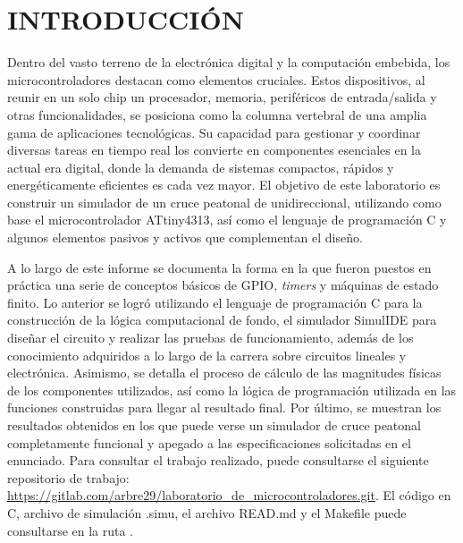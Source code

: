 \newpage
\section{INTRODUCCIÓN}
Dentro del vasto terreno de la electrónica digital y la computación embebida, los microcontroladores destacan como elementos cruciales. Estos dispositivos, al reunir en un solo chip un procesador, memoria, periféricos de entrada/salida y otras funcionalidades, se posiciona como la columna vertebral de una amplia gama de aplicaciones tecnológicas. Su capacidad para gestionar y coordinar diversas tareas en tiempo real los convierte en componentes esenciales en la actual era digital, donde la demanda de sistemas compactos, rápidos y energéticamente eficientes es cada vez mayor. El objetivo de este laboratorio es construir un simulador de un cruce peatonal de unidireccional, utilizando como base el microcontrolador ATtiny4313, así como el lenguaje de programación C y algunos elementos pasivos y activos que complementan el diseño.  

A lo largo de este informe se documenta la forma en la que fueron puestos en práctica una serie de conceptos básicos de GPIO, \textit{timers} y máquinas de estado finito. Lo anterior se logró utilizando el lenguaje de programación C para la construcción de la lógica computacional de fondo, el simulador SimulIDE para diseñar el circuito y realizar las pruebas de funcionamiento, además de los conocimiento adquiridos a lo largo de la carrera sobre circuitos lineales y electrónica. Asimismo, se detalla el proceso de cálculo de las magnitudes físicas de los componentes utilizados, así como la lógica de programación utilizada en las funciones construidas para llegar al resultado final. Por último, se muestran los resultados obtenidos en los que puede verse un simulador de cruce peatonal completamente funcional y apegado a las especificaciones solicitadas en el enunciado. Para consultar el trabajo realizado, puede consultarse el siguiente repositorio de trabajo: \url{https://gitlab.com/arbre29/laboratorio_de_microcontroladores.git}. El código en C, archivo de simulación .simu, el archivo READ.md y el Makefile puede consultarse en la ruta . 